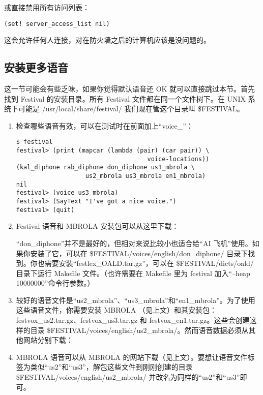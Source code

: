 或直接禁用所有访问列表：

\begin{verbatim}
(set! server_access_list nil)
\end{verbatim}

这会允许任何人连接，对在防火墙之后的计算机应该是没问题的。

\subsection{安装更多语音}

这一节可能会有些乏味，如果你觉得默认语音还 OK 就可以直接跳过本节。首先找到 Festival 的安装目录。所有 Festival 文件都在同一个文件树下。在 UNIX 系统下可能是 /usr/local/share/festival/ 我们现在管这个目录叫 \$FESTIVAL。

\begin{enumerate}
\item 检查哪些语音有效，可以在测试时在前面加上“voice\_”：

\begin{verbatim}
$ festival
festival> (print (mapcar (lambda (pair) (car pair)) \
                                    voice-locations))
(kal_diphone rab_diphone don_diphone us1_mbrola \
                   us2_mbrola us3_mbrola en1_mbrola)
nil
festival> (voice_us3_mbrola)
festival> (SayText "I've got a nice voice.")
festival> (quit)
\end{verbatim}

\item Festival 语音和 MBROLA 安装包可以从这里下载：


“don\_diphone”并不是最好的，但相对来说比较小也适合给“AI 飞机”使用。如果你安装了它，可以在 \$FESTIVAL/voices/english/don\_diphone/ 目录下找到。你也需要安装“festlex\_OALD.tar.gz”，可以在 \$FESTIVAL/dicts/oald/ 目录下运行 Makefile 文件。（也许需要在 Makefile 里为 festival 加入“--heap 10000000”命令行参数。）

\item 较好的语音文件是“us2\_mbrola”、“us3\_mbrola”和“en1\_mbrola”。为了使用这些语音文件，你需要安装 MBROLA （见上文）和其安装包：festvox\_us2.tar.gz、festvox\_us3.tar.gz 和 festvox\_en1.tar.gz。这些会创建这样的目录 \$FESTIVAL/voices/english/us2\_mbrola/。然而语音数据必须从其他网站分别下载：

\item MBROLA 语音可以从 MBROLA 的网站下载（见上文）。要想让语音文件标签为类似“us2”和“us3”，解包这些文件到刚刚创建的目录 \$FESTIVAL/voices/english/us2\_mbrola/ 并改名为同样的“us2”和“us3”即可。

\end{enumerate}

